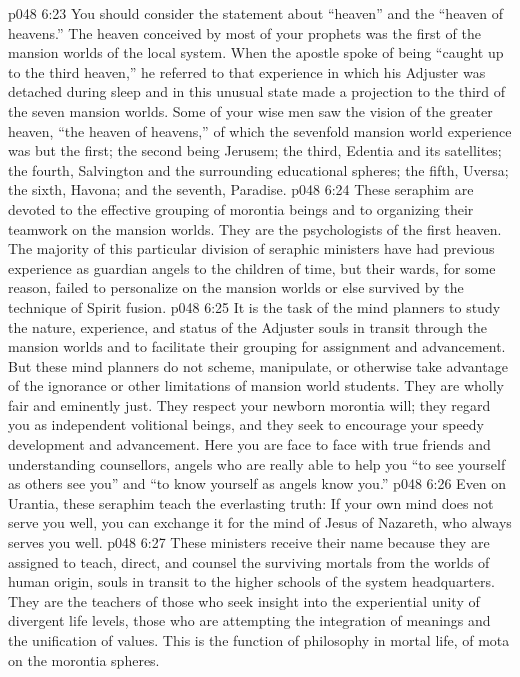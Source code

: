 \vs p048 6:23 \pc You should consider the statement about “heaven” and the “heaven of heavens.” The heaven conceived by most of your prophets was the first of the mansion worlds of the local system. When the apostle spoke of being “caught up to the third heaven,” he referred to that experience in which his Adjuster was detached during sleep and in this unusual state made a projection to the third of the seven mansion worlds. Some of your wise men saw the vision of the greater heaven, “the heaven of heavens,” of which the sevenfold mansion world experience was but the first; the second being Jerusem; the third, Edentia and its satellites; the fourth, Salvington and the surrounding educational spheres; the fifth, Uversa; the sixth, Havona; and the seventh, Paradise.
\vs p048 6:24 \bibnobreakspace {} These seraphim are devoted to the effective grouping of morontia beings and to organizing their teamwork on the mansion worlds. They are the psychologists of the first heaven. The majority of this particular division of seraphic ministers have had previous experience as guardian angels to the children of time, but their wards, for some reason, failed to personalize on the mansion worlds or else survived by the technique of Spirit fusion.
\vs p048 6:25 It is the task of the mind planners to study the nature, experience, and status of the Adjuster souls in transit through the mansion worlds and to facilitate their grouping for assignment and advancement. But these mind planners do not scheme, manipulate, or otherwise take advantage of the ignorance or other limitations of mansion world students. They are wholly fair and eminently just. They respect your newborn morontia will; they regard you as independent volitional beings, and they seek to encourage your speedy development and advancement. Here you are face to face with true friends and understanding counsellors, angels who are really able to help you “to see yourself as others see you” and “to know yourself as angels know you.”
\vs p048 6:26 Even on Urantia, these seraphim teach the everlasting truth: If your own mind does not serve you well, you can exchange it for the mind of Jesus of Nazareth, who always serves you well.
\vs p048 6:27 \bibnobreakspace {} These ministers receive their name because they are assigned to teach, direct, and counsel the surviving mortals from the worlds of human origin, souls in transit to the higher schools of the system headquarters. They are the teachers of those who seek insight into the experiential unity of divergent life levels, those who are attempting the integration of meanings and the unification of values. This is the function of philosophy in mortal life, of mota on the morontia spheres.
